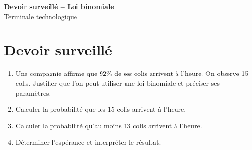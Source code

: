 \documentclass[french,11pt]{book}
\begin{document}
\begin{center}
{\Large \textbf{Devoir surveillé -- Loi binomiale}}\\[2mm]
Terminale technologique
\end{center}

\section*{Devoir surveillé}
\begin{enumerate}
  \item Une compagnie affirme que 92\% de ses colis arrivent à l'heure. On observe 15 colis. Justifier que l'on peut utiliser une loi binomiale et préciser ses paramètres.
  \item Calculer la probabilité que les 15 colis arrivent à l'heure.
  \item Calculer la probabilité qu'au moins 13 colis arrivent à l'heure.
  \item Déterminer l'espérance et interpréter le résultat.
\end{enumerate}
\end{document}
